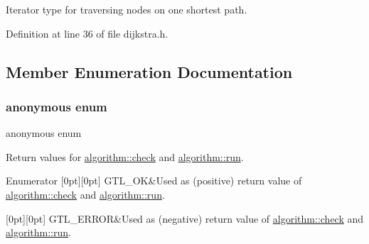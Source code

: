 Iterator type for traversing nodes on one shortest path. 



Definition at line 36 of file dijkstra.\+h.



\subsection{Member Enumeration Documentation}
\mbox{\label{classalgorithm_af1a0078e153aa99c24f9bdf0d97f6710}} 
\subsubsection{\texorpdfstring{anonymous enum}{anonymous enum}}
{\footnotesize\ttfamily anonymous enum\hspace{0.3cm}{\ttfamily [inherited]}}



Return values for \mbox{\hyperlink{classalgorithm_a76361fb03ad1cf643affc51821e43bed}{algorithm\+::check}} and \mbox{\hyperlink{classalgorithm_a734b189509a8d6b56b65f8ff772d43ca}{algorithm\+::run}}. 

\begin{DoxyEnumFields}{Enumerator}
[0pt][0pt]{}\mbox{\label{classalgorithm_af1a0078e153aa99c24f9bdf0d97f6710a5114c20e4a96a76b5de9f28bf15e282b}} 
G\+T\+L\+\_\+\+OK&Used as (positive) return value of \mbox{\hyperlink{classalgorithm_a76361fb03ad1cf643affc51821e43bed}{algorithm\+::check}} and \mbox{\hyperlink{classalgorithm_a734b189509a8d6b56b65f8ff772d43ca}{algorithm\+::run}}. \\
\hline

[0pt][0pt]{}\mbox{\label{classalgorithm_af1a0078e153aa99c24f9bdf0d97f6710a6fcf574690bbd6cf710837a169510dd7}} 
G\+T\+L\+\_\+\+E\+R\+R\+OR&Used as (negative) return value of \mbox{\hyperlink{classalgorithm_a76361fb03ad1cf643affc51821e43bed}{algorithm\+::check}} and \mbox{\hyperlink{classalgorithm_a734b189509a8d6b56b65f8ff772d43ca}{algorithm\+::run}}. \\
\hline

\end{DoxyEnumFields}


